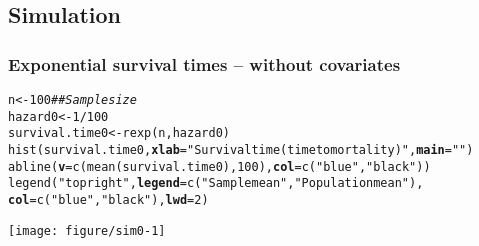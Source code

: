 \documentclass[color=usenames,dvipsnames]{beamer}\usepackage[]{graphicx}\usepackage[]{xcolor}
\makeatletter
\newcommand{\hlnum}[1]{\textcolor[rgb]{0.69,0.494,0}{#1}}%
\newcommand{\hlsng}[1]{\textcolor[rgb]{0.749,0.012,0.012}{#1}}%
\newcommand{\hlcom}[1]{\textcolor[rgb]{0.514,0.506,0.514}{\textit{#1}}}%
\newcommand{\hlopt}[1]{\textcolor[rgb]{0,0,0}{#1}}%
\newcommand{\hldef}[1]{\textcolor[rgb]{0,0,0}{#1}}%
\newcommand{\hlkwb}[1]{\textcolor[rgb]{0,0.341,0.682}{#1}}%
\newcommand{\hlkwc}[1]{\textcolor[rgb]{0,0,0}{\textbf{#1}}}%
\newcommand{\hlkwd}[1]{\textcolor[rgb]{0.004,0.004,0.506}{#1}}%
\newenvironment{kframe}{%
 \def\at@end@of@kframe{}%
 \ifinner\ifhmode%
  \def\at@end@of@kframe{\end{minipage}}%
  \begin{minipage}{\columnwidth}%
 \fi\fi%
 \def\FrameCommand##1{\hskip\@totalleftmargin \hskip-\fboxsep
 \colorbox{shadecolor}{##1}\hskip-\fboxsep
     \hskip-\linewidth \hskip-\@totalleftmargin \hskip\columnwidth}%
 \MakeFramed {\advance\hsize-\width
   \@totalleftmargin\z@ \linewidth\hsize
   \@setminipage}}%
 {\par\unskip\endMakeFramed%
 \at@end@of@kframe}
\newenvironment{knitrout}{}{} %
\makeatother
\begin{document}
\subsection{Simulation}


\begin{frame}[fragile]
  \frametitle{\large Exponential survival times -- without covariates}
\begin{knitrout}\scriptsize
{}\color{fgcolor}\begin{kframe}
\begin{alltt}
\hldef{n} \hlkwb{<-} \hlnum{100}                          \hlcom{## Sample size}
\hldef{hazard0} \hlkwb{<-} \hlnum{1}\hlopt{/}\hlnum{100}
\hldef{survival.time0} \hlkwb{<-} \hlkwd{rexp}\hldef{(n, hazard0)}
\hlkwd{hist}\hldef{(survival.time0,} \hlkwc{xlab}\hldef{=}\hlsng{"Survival time (time to mortality)"}\hldef{,} \hlkwc{main}\hldef{=}\hlsng{""}\hldef{)}
\hlkwd{abline}\hldef{(}\hlkwc{v}\hldef{=}\hlkwd{c}\hldef{(}\hlkwd{mean}\hldef{(survival.time0),} \hlnum{100}\hldef{),} \hlkwc{col}\hldef{=}\hlkwd{c}\hldef{(}\hlsng{"blue"}\hldef{,} \hlsng{"black"}\hldef{))}
\hlkwd{legend}\hldef{(}\hlsng{"topright"}\hldef{,} \hlkwc{legend}\hldef{=}\hlkwd{c}\hldef{(}\hlsng{"Sample mean"}\hldef{,} \hlsng{"Population mean"}\hldef{),}
       \hlkwc{col}\hldef{=}\hlkwd{c}\hldef{(}\hlsng{"blue"}\hldef{,} \hlsng{"black"}\hldef{),} \hlkwc{lwd}\hldef{=}\hlnum{2}\hldef{)}
\end{alltt}
\end{kframe}

{\centering \texttt{[image: figure/sim0-1]} 

}


\end{knitrout}
\end{frame}
\end{document}
